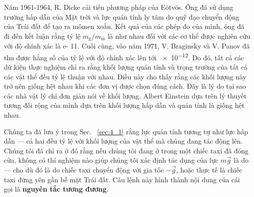 Năm 1961-1964, R. Dicke cải tiến phương pháp của E\"{o}tv\"{o}s. Ông đã sử dụng trường hấp dẫn của Mặt trời và lực quán tính ly tâm do quỹ đạo chuyển động của Trái đất để tạo ra mômen xoắn. Kết quả của các phép đo của mình, ông đã đi đến kết luận rằng tỷ lệ $m_{\text{g}}/m_{\text{in}}$ là như nhau đối với các cơ thể được nghiên cứu với độ chính xác là \num{e- 11}. Cuối cùng, vào năm 1971, V. Braginsky và V. Panov đã thu được hằng số của tỷ lệ với độ chính xác lên tới \num{e-12}.
Do đó, tất cả các dữ kiện thực nghiệm chỉ ra rằng khối lượng quán tính và trọng trường của tất cả các vật thể đều tỷ lệ thuận với nhau. Điều này cho thấy rằng các khối lượng này trở nên giống hệt nhau khi các đơn vị được chọn đúng cách. Đây là lý do tại sao các nhà vật lý chỉ đơn giản nói về khối lượng. Albert Einstein dựa trên lý thuyết tương đối rộng của mình dựa trên khối lượng hấp dẫn và quán tính là giống hệt nhau.

Chúng ta đã lưu ý trong Sec. ~\ref{sec:4_1} rằng lực quán tính tương tự như lực hấp dẫn --- cả hai đều tỷ lệ với khối lượng của vật thể mà chúng đang tác động lên. Chúng tôi đã chỉ ra ở đó rằng nếu chúng tôi đang ở trong một chiếc taxi đã đóng cửa, không có thí nghiệm nào giúp chúng tôi xác định tác dụng của lực $m\vec{g}$ là do --- cho dù đó là do chiếc taxi chuyển động với gia tốc $-\vec{g}$, hoặc thực tế là chiếc taxi đứng yên gần bề mặt Trái đất. Câu lệnh này hình thành nội dung của cái gọi là \textbf{nguyên tắc tương đương}.

